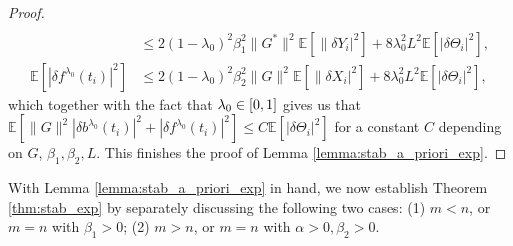 \documentclass[11pt]{article}
\numberwithin{equation}{section}
\theoremstyle{definition}
\theoremstyle{remark}
\def\b{\beta}  \def\a{\alpha} \def\ga{\gamma}
\def\sE{{\mathbb{E}}}
\begin{document}
\begin{proof}
\begin{align*}
\\
&\le 
2(1-\lambda_0)^2\b^2_1\|G^*\|^2\sE[\|\delta Y_i|^2]+8\lambda^2_0 L^2\sE[|\delta \Theta_i|^2],
\\
\sE[|\delta f^{\lambda_0}(t_{i})|^2]
&\le 
2(1-\lambda_0)^2\b^2_2\|G\|^2\sE[\|\delta X_i|^2]+8\lambda^2_0 L^2\sE[|\delta \Theta_i|^2],
\end{align*}
which
together with the fact that $\lambda_0\in [0,1]$
gives us that 
$\sE[
\|G\|^2|\delta b^{\lambda_0}(t_{i})|^2+|\delta f^{\lambda_0}(t_{i})|^2]
\le C\sE[|\delta \Theta_i|^2]$
for a constant $C$ depending on $G$, $\b_1,\b_2, L$.
This finishes the proof of Lemma \ref{lemma:stab_a_priori_exp}.
\end{proof}


With Lemma \ref{lemma:stab_a_priori_exp} in hand, we now establish Theorem \ref{thm:stab_exp}
by separately discussing the following two cases: 
(1) $m< n$,  or $m=n$ with $\beta_1>0$;
 (2)
$m> n$, or $m=n$ with $\a>0,\beta_2>0$.
\end{document}
